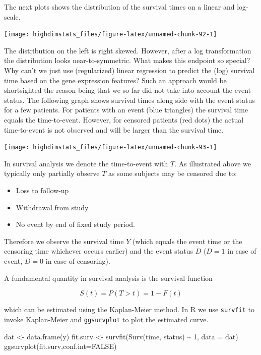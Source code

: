 \documentclass[
]{book}
\newenvironment{Shaded}{\begin{snugshade}}{\end{snugshade}}
\newcommand{\AttributeTok}[1]{\textcolor[rgb]{0.77,0.63,0.00}{#1}}
\newcommand{\ConstantTok}[1]{\textcolor[rgb]{0.00,0.00,0.00}{#1}}
\newcommand{\DecValTok}[1]{\textcolor[rgb]{0.00,0.00,0.81}{#1}}
\newcommand{\FunctionTok}[1]{\textcolor[rgb]{0.00,0.00,0.00}{#1}}
\newcommand{\NormalTok}[1]{#1}
\newcommand{\OtherTok}[1]{\textcolor[rgb]{0.56,0.35,0.01}{#1}}
\newcommand{\SpecialCharTok}[1]{\textcolor[rgb]{0.00,0.00,0.00}{#1}}
\providecommand{\tightlist}{%
  \setlength{\itemsep}{0pt}\setlength{\parskip}{0pt}}
\begin{document}
The next plots shows the distribution of the survival times on a linear and log-scale.

\begin{center}\texttt{[image: highdimstats\_files/figure-latex/unnamed-chunk-92-1]} \end{center}

The distribution on the left is right skewed. However, after a log transformation the distribution looks near-to-symmetric. What makes this endpoint so special? Why can't we just use (regularized) linear regression to predict the (log) survival time based on the gene expression features? Such an approach would be shortsighted the reason being that we so far did not take into account the event status. The following graph shows survival times along side with the event status for a few patients. For patients with an event (blue triangles) the survival time equals the time-to-event. However, for censored patients (red dots) the actual time-to-event is not observed and will be larger than the survival time.

\begin{center}\texttt{[image: highdimstats\_files/figure-latex/unnamed-chunk-93-1]} \end{center}

In survival analysis we denote the time-to-event with \(T\). As illustrated above we typically only partially observe \(T\) as some subjects may be censored due to:

\begin{itemize}
\tightlist
\item
  Loss to follow-up
\item
  Withdrawal from study
\item
  No event by end of fixed study period.
\end{itemize}

Therefore we observe the survival time \(Y\) (which equals the event time or the censoring time whichever occurs earlier) and the event status \(D\) (\(D=1\) in case of event, \(D=0\) in case of censoring).

A fundamental quantity in survival analysis is the survival function

\[S(t)=P(T>t)=1-F(t)\]

which can be estimated using the Kaplan-Meier method. In R we use \texttt{survfit} to invoke Kaplan-Meier and \texttt{ggsurvplot} to plot the estimated curve.

\begin{Shaded}
\begin{Highlighting}[]
\NormalTok{dat }\OtherTok{\textless{}{-}} \FunctionTok{data.frame}\NormalTok{(y)}
\NormalTok{fit.surv }\OtherTok{\textless{}{-}} \FunctionTok{survfit}\NormalTok{(}\FunctionTok{Surv}\NormalTok{(time, status) }\SpecialCharTok{\textasciitilde{}} \DecValTok{1}\NormalTok{, }
                    \AttributeTok{data =}\NormalTok{ dat)}
\FunctionTok{ggsurvplot}\NormalTok{(fit.surv,}\AttributeTok{conf.int=}\ConstantTok{FALSE}\NormalTok{)}
\end{Highlighting}
\end{Shaded}
\end{document}
